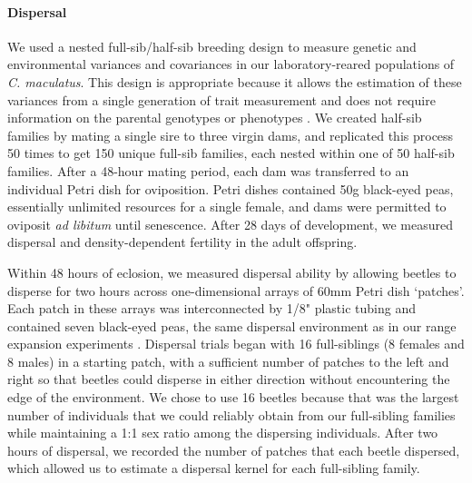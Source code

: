 \documentclass[11pt]{article}
\begin{document}
\paragraph{Dispersal}
We used a nested full-sib/half-sib breeding design to measure genetic and environmental variances and covariances in our laboratory-reared populations of \textit{C. maculatus}.
This design is appropriate because it allows the estimation of these variances from a single generation of trait measurement and does not require information on the parental genotypes or phenotypes \citep{falconer_introduction_1996,conner_primer_2004,wilson_ecologists_2010}.
We created half-sib families by mating a single sire to three virgin dams, and replicated this process 50 times to get 150 unique full-sib families, each nested within one of 50 half-sib families.
After a 48-hour mating period, each dam was transferred to an individual Petri dish for oviposition.
Petri dishes contained 50g black-eyed peas, essentially unlimited resources for a single female, and dams were permitted to oviposit \textit{ad libitum} until senescence.
After 28 days of development, we measured dispersal and density-dependent fertility in the adult offspring.

Within 48 hours of eclosion, we measured dispersal ability by allowing beetles to disperse for two hours across one-dimensional arrays of 60mm Petri dish `patches'.
Each patch in these arrays was interconnected by 1/8" plastic tubing and contained seven black-eyed peas, the same dispersal environment as in our range expansion experiments \citep{ochocki_rapid_2017}.
Dispersal trials began with 16 full-siblings (8 females and 8 males) in a starting patch, with a sufficient number of patches to the left and right so that beetles could disperse in either direction without encountering the edge of the environment.
We chose to use 16 beetles because that was the largest number of individuals that we could reliably obtain from our full-sibling families while maintaining a 1:1 sex ratio among the dispersing individuals.
After two hours of dispersal, we recorded the number of patches that each beetle dispersed, which allowed us to estimate a dispersal kernel for each full-sibling family.
\end{document}
